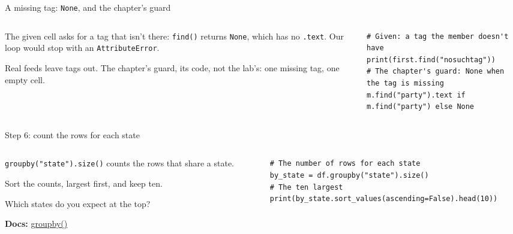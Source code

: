 \documentclass[9pt,aspectratio=169]{beamer}
\begin{document}
\begin{frame}[fragile]{A missing tag: \texttt{None}, and the chapter's guard}
    \begin{columns}[T]
        \begin{column}{0.37\textwidth}
            The given cell asks for a tag that isn't there: \texttt{find()} returns \texttt{None}, which has no \texttt{.text}. Our loop would stop with an \texttt{AttributeError}.

            \medskip
            Real feeds leave tags out. The chapter's guard, its code, not the lab's: one missing tag, one empty cell.
        \end{column}
        \begin{column}{0.6\textwidth}
\begin{lstlisting}
# Given: a tag the member doesn't have
print(first.find("nosuchtag"))
# The chapter's guard: None when the tag is missing
m.find("party").text if m.find("party") else None
\end{lstlisting}
        \end{column}
    \end{columns}
\end{frame}

\begin{frame}[fragile]{Step 6: count the rows for each state}
    \begin{columns}[T]
        \begin{column}{0.37\textwidth}
            \texttt{groupby("state").size()} counts the rows that share a state.

            \medskip
            Sort the counts, largest first, and keep ten.

            \medskip
            Which states do you expect at the top?

            \medskip
            {\scriptsize\textbf{Docs:} \href{https://pandas.pydata.org/docs/reference/api/pandas.DataFrame.groupby.html}{groupby()}\par}
        \end{column}
        \begin{column}{0.6\textwidth}
\begin{lstlisting}
# The number of rows for each state
by_state = df.groupby("state").size()
# The ten largest
print(by_state.sort_values(ascending=False).head(10))
\end{lstlisting}
        \end{column}
    \end{columns}
\end{frame}
\end{document}
